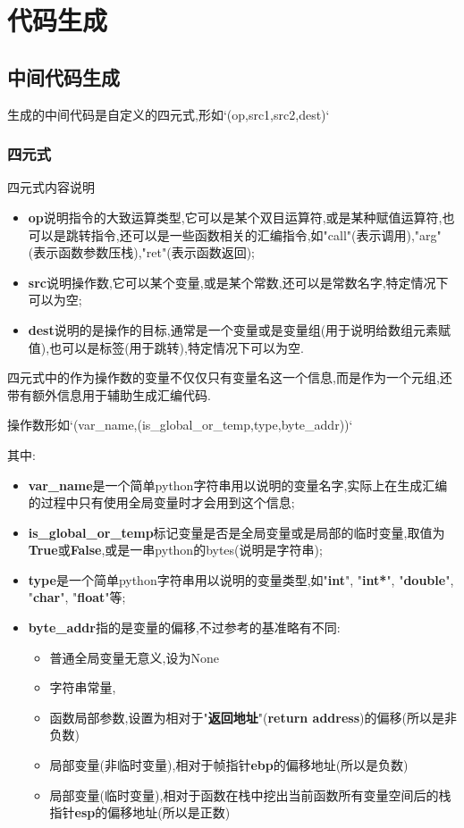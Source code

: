 \documentclass{article}
\begin{document}
\section{代码生成}

\subsection{中间代码生成}

生成的中间代码是自定义的四元式,形如`(op,src1,src2,dest)`

\subsubsection{四元式}

四元式内容说明

\begin{itemize}
	\item  \textbf{op}说明指令的大致运算类型,它可以是某个双目运算符,或是某种赋值运算符,也可以是跳转指令,还可以是一些函数相关的汇编指令,如"call"(表示调用),"arg"(表示函数参数压栈),"ret"(表示函数返回);
	\item \textbf{src}说明操作数,它可以某个变量,或是某个常数,还可以是常数名字,特定情况下可以为空; 
	\item \textbf{dest}说明的是操作的目标,通常是一个变量或是变量组(用于说明给数组元素赋值),也可以是标签(用于跳转),特定情况下可以为空.
\end{itemize}

四元式中的作为操作数的变量不仅仅只有变量名这一个信息,而是作为一个元组,还带有额外信息用于辅助生成汇编代码.

操作数形如`(var\_name,(is\_global\_or\_temp,type,byte\_addr))`

其中:

\begin{itemize}
\item  \textbf{var\_name}是一个简单python字符串用以说明的变量名字,实际上在生成汇编的过程中只有使用全局变量时才会用到这个信息;
\item   \textbf{is\_global\_or\_temp}标记变量是否是全局变量或是局部的临时变量,取值为\textbf{True}或\textbf{False},或是一串python的bytes(说明是字符串);
\item  \textbf{type}是一个简单python字符串用以说明的变量类型,如"\textbf{int}", "\textbf{int*}", "\textbf{double}", "\textbf{char}", "\textbf{float}"等;
\item  \textbf{byte\_addr}指的是变量的偏移,不过参考的基准略有不同:\begin{itemize}
				\item  普通全局变量无意义,设为None
				\item  字符串常量,
				\item  函数局部参数,设置为相对于"\textbf{返回地址}"(\textbf{return address})的偏移(所以是非负数)
				\item  局部变量(非临时变量),相对于帧指针\textbf{ebp}的偏移地址(所以是负数)
				\item  局部变量(临时变量),相对于函数在栈中挖出当前函数所有变量空间后的栈指针\textbf{esp}的偏移地址(所以是正数)
				\end{itemize}
\end{itemize}
\end{document}
